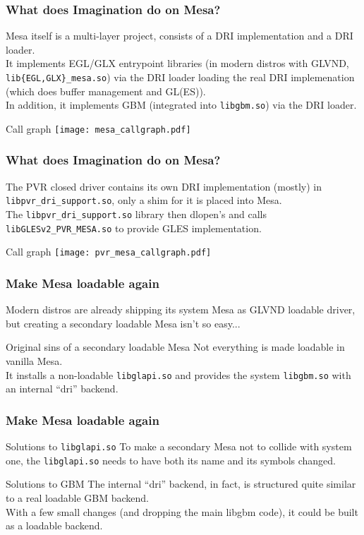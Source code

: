 \documentclass{beamer}
\begin{document}
\begin{frame}
	\frametitle{What does Imagination do on Mesa?}
	Mesa itself is a multi-layer project, consists of a DRI implementation and a DRI loader. \\
	It implements EGL/GLX entrypoint libraries (in modern distros with GLVND, \texttt{lib\{EGL,GLX\}\_mesa.so}) via the DRI loader loading the real DRI implemenation (which does buffer management and GL(ES)). \\
	In addition, it implements GBM (integrated into \texttt{libgbm.so}) via the DRI loader.
	\begin{block}{Call graph}
		\texttt{[image: mesa\_callgraph.pdf]}
	\end{block}
\end{frame}

\begin{frame}
	\frametitle{What does Imagination do on Mesa?}
	The PVR closed driver contains its own DRI implementation (mostly) in \texttt{libpvr\_dri\_support.so}, only a shim for it is placed into Mesa. \\ The \texttt{libpvr\_dri\_support.so} library then dlopen's and calls \texttt{libGLESv2\_PVR\_MESA.so} to provide GLES implementation.
	\begin{block}{Call graph}
		\texttt{[image: pvr\_mesa\_callgraph.pdf]}
	\end{block}
\end{frame}

\begin{frame}
	\frametitle{Make Mesa loadable again}
	Modern distros are already shipping its system Mesa as GLVND loadable driver, but creating a secondary loadable Mesa isn't so easy...
	\begin{block}{Original sins of a secondary loadable Mesa}
		Not everything is made loadable in vanilla Mesa. \\
		It installs a non-loadable \texttt{libglapi.so} and provides the system \texttt{libgbm.so} with an internal ``dri'' backend.
	\end{block}
\end{frame}

\begin{frame}
	\frametitle{Make Mesa loadable again}
	\begin{block}{Solutions to \texttt{libglapi.so}}
		To make a secondary Mesa not to collide with system one, the \texttt{libglapi.so} needs to have both its name and its symbols changed.
	\end{block}
	\begin{block}{Solutions to GBM}
		The internal ``dri'' backend, in fact, is structured quite similar to a real loadable GBM backend. \\
		With a few small changes (and dropping the main libgbm code), it could be built as a loadable backend.
	\end{block}
\end{frame}
\end{document}
